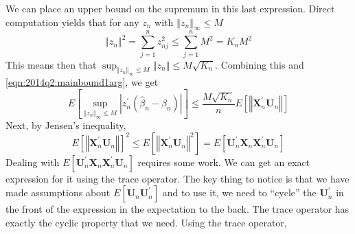 We can place an upper bound on the supremum in this last expression. Direct
computation yields that for any \(z_{n}\) with \(\left\Vert z_{n}
\right\Vert_{\infty} \leq M\)
\[
  \left\Vert z_{n} \right\Vert^{2} = \sum_{j = 1}^{n} z_{n j}^{2} \leq \sum_{j =
  1}^{n} M^{2} = K_{n} M^{2}
\]
This means then that \(\sup_{\left\Vert z_{n} \right\Vert_{\infty} \leq M}
\left\Vert z_{n} \right\Vert \leq M \sqrt{K_{n}}\). Combining this and
\eqref{eqn:2014q2:mainbound1arg}, we get
\begin{equation}
  E \left[ \sup_{\left\Vert z_{n} \right\Vert_{\infty} \leq M} \left|
  z_{n}^{\prime} \left( \widehat{\beta}_{n} - \beta_{n} \right) \right| \right]
  \leq \frac{M \sqrt{K_{n}}}{n} E \left[ \left\Vert \mathbf{X}_{n}^{\prime}
  \mathbf{U}_{n} \right\Vert \right] \label{eqn:2014q2:mainbound1}
\end{equation}
Next, by Jensen's inequality,
\begin{equation}
  E \left[ \left\Vert \mathbf{X}_{n}^{\prime} \mathbf{U}_{n} \right\Vert
  \right]^{2} \leq E \left[ \left\Vert \mathbf{X}_{n}^{\prime} \mathbf{U}_{n}
  \right\Vert^{2} \right] = E \left[ \mathbf{U}_{n}^{\prime} \mathbf{X}_{n}
  \mathbf{X}_{n}^{\prime} \mathbf{U}_{n} \right] \label{eqn:2014q2:jensen}
\end{equation}
Dealing with \(E \left[ \mathbf{U}_{n}^{\prime} \mathbf{X}_{n}
\mathbf{X}_{n}^{\prime} \mathbf{U}_{n} \right]\) requires some work. We can get
an exact expression for it using the trace operator. The key thing to notice is
that we have made assumptions about \(E \left[ \mathbf{U}_{n}
\mathbf{U}_{n}^{\prime} \right]\) and to use it, we need to ``cycle'' the
\(\mathbf{U}_{n}^{\prime}\) in the front of the expression in the expectation to
the back. The trace operator has exactly the cyclic property that we need. Using
the trace operator,
